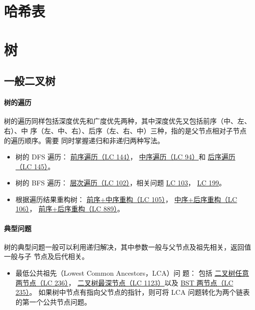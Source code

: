 \section{哈希表}

\section{树}

\subsection{一般二叉树}
\paragraph{树的遍历}
树的遍历同样包括深度优先和广度优先两种，其中深度优先又包括前序（中、左、右）、中
序（左、中、右）、后序（左、右、中）三种，指的是父节点相对子节点的遍历顺序。需要
同时掌握递归和非递归两种写法。

\begin{itemize}
\item 树的 DFS 遍历：
  \href{https://leetcode.com/problems/binary-tree-preorder-traversal}
  {前序遍历（LC 144）}，
  \href{https://leetcode.com/problems/binary-tree-inorder-traversal}
  {中序遍历（LC 94）}和
  \href{https://leetcode.com/problems/binary-tree-postorder-traversal}
  {后序遍历（LC 145）}。

\item 树的 BFS 遍历：
  \href{https://leetcode.com/problems/binary-tree-postorder-traversal}
  {层次遍历（LC 102）}，相关问题
  \href{https://leetcode.com/problems/binary-tree-zigzag-level-order-traversal}
  {LC 103}，
  \href{https://leetcode.com/problems/binary-tree-right-side-view}
  {LC 199}。

\item 根据遍历结果重构树：
  \href{https://leetcode.com/problems/construct-binary-tree-from-preorder-and-inorder-traversal}
  {前序+中序重构（LC 105）}，
  \href{https://leetcode.com/problems/construct-binary-tree-from-inorder-and-postorder-traversal}
  {中序+后序重构（LC 106）}，
  \href{https://leetcode.com/problems/construct-binary-tree-from-preorder-and-postorder-traversal}
  {前序+后序重构（LC 889）}。
\end{itemize}

\paragraph{典型问题}
树的典型问题一般可以利用递归解决，其中参数一般与父节点及祖先相关，返回值一般与子
节点及后代相关。
\begin{itemize}
\item 最低公共祖先（Lowest Common Ancestors，LCA）问
  题：
  包括
  \href{https://leetcode.com/problems/lowest-common-ancestor-of-a-binary-tree}
  {二叉树任意两节点（LC 236）}，
  \href{https://leetcode.com/problems/lowest-common-ancestor-of-deepest-leaves}
  {二叉树最深节点（LC 1123）}以及
  \href{https://leetcode.com/problems/lowest-common-ancestor-of-a-binary-search-tree}
  {BST 两节点（LC 235）}。
  如果树中节点有指向父节点的指针，则可将 LCA 问题转化为两个链表的第一个公共节点问题。
\end{itemize}

